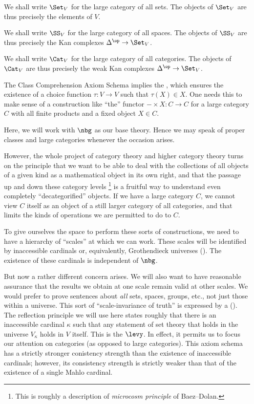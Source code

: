 \begin{eg}
	We shall write $ \Set_V $ for the large category of all sets.
	The objects of $ \Set_V$ are thus precisely the elements of $V$.

	We shall write $ \SS_V $ for the large category of all spaces.
	The objects of $ \SS_V $ are thus precisely the Kan complexes $ \Delta^{\op} \to \Set_V $.

	We shall write $ \Cat_V $ for the large category of all categories.
	The objects of $ \Cat_V $ are thus precisely the weak Kan complexes $ \Delta^{\op} \to \Set_V $.
\end{eg}

The Class Comprehension Axiom Schema implies the ,
which ensures the existence of a choice function $ \tau \colon V \to V $ such that $ \tau(X) \in X $.
One needs this to make sense of a construction like \enquote{the} functor $ - \times X \colon C \to C $ for a large category $ C $ with all finite products and a fixed object $ X \in C $.

Here, we will work with $\nbg$ as our base theory.
Hence we may speak of proper classes and large categories whenever the occasion arises.

However, the whole project of category theory and higher category theory turns on the principle that we want to be able to deal with the collections of all objects of a given kind as a mathematical object in its own right,
and that the passage up and down these category levels%
\footnote{This is roughly a description of \emph{microcosm principle} of Baez--Dolan.} 
is a fruitful way to understand even completely \enquote{decategorified} objects.
If we have a large category $C$, we cannot view $C$ itself as an object of a still larger category of all categories,
and that limits the kinds of operations we are permitted to do to $ C $.

To give ourselves the space to perform these sorts of constructions,
we need to have a hierarchy of \enquote{scales} at which we can work.
These scales will be identified by inaccessible cardinals
or, equivalently, Grothendieck universes ().
The existence of these cardinals is independent of $ \nbg $.

But now a rather different concern arises.
We will also want to have reasonable assurance that the results we obtain at one scale remain valid at other scales.
We would prefer to prove sentences about \emph{all} sets, spaces, groups, etc., not just those within a universe.
This sort of \enquote{scale-invariance of truth} is expressed by a  ().
The reflection principle we will use here states roughly that there is an inaccessible cardinal $ \kappa $ such that any statement of set theory that holds in the universe $ V_{\kappa} $ holds in $V$ itself.
This is the  $ \levy $.
In effect, it permits us to focus our attention on categories (as opposed to large categories).
This axiom schema has a strictly stronger conistency strength than the existence of inaccessible cardinals;
however, its consistency strength is strictly weaker than that of the existence of a single Mahlo cardinal.

